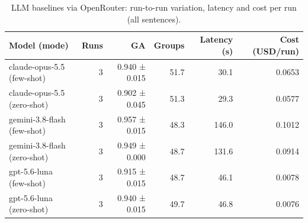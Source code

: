 \begin{table}[t]
\centering
\caption{LLM baselines via OpenRouter: run-to-run variation, latency and cost per run (all sentences).}
\label{tab:llm_cost}
\small
\begin{tabular}{lrrrrr}
\toprule
Model (mode) & Runs & GA & Groups & Latency (s) & Cost (USD/run) \\
\midrule
claude-opus-5.5 (few-shot) & 3 & 0.940 ± 0.015 & 51.7 & 30.1 & 0.0653 \\
claude-opus-5.5 (zero-shot) & 3 & 0.902 ± 0.045 & 51.3 & 29.3 & 0.0577 \\
gemini-3.8-flash (few-shot) & 3 & 0.957 ± 0.015 & 48.3 & 146.0 & 0.1012 \\
gemini-3.8-flash (zero-shot) & 3 & 0.949 ± 0.000 & 48.7 & 131.6 & 0.0914 \\
gpt-5.6-luna (few-shot) & 3 & 0.915 ± 0.015 & 48.7 & 46.1 & 0.0078 \\
gpt-5.6-luna (zero-shot) & 3 & 0.940 ± 0.015 & 49.7 & 46.8 & 0.0076 \\
\bottomrule
\end{tabular}
\end{table}